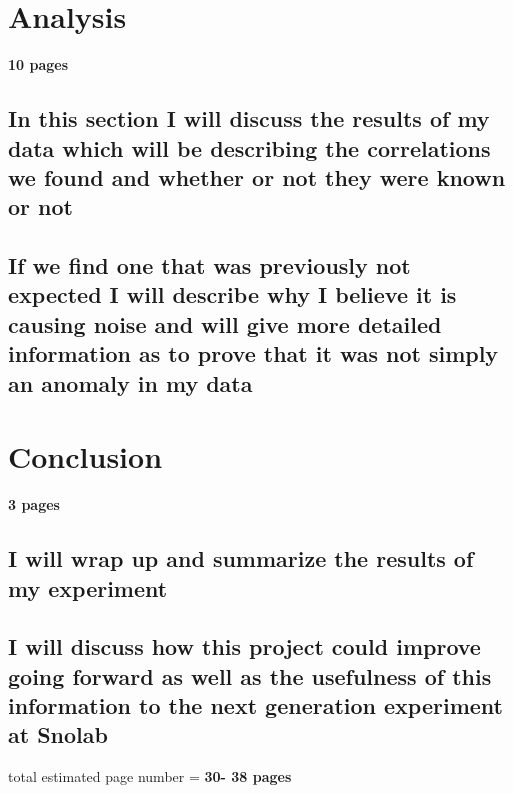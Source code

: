 \section{Analysis} \textbf{10 pages}
\subsection{In this section I will discuss the results of my data which will be describing the correlations we found and whether or not they were known or not}
\subsection{If we find one that was previously not expected I will describe why I believe it is causing noise and will give more detailed information as to prove that it was not simply an anomaly in my data}
\section{Conclusion} \textbf{3 pages}
\subsection{I will wrap up and summarize the results of my experiment} 

\subsection{I will discuss how this project could improve going forward as well as the usefulness of this information to the next generation experiment at Snolab}


total estimated page number = \textbf{30- 38 pages}
